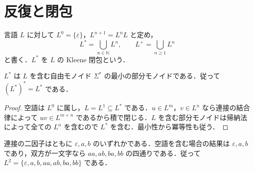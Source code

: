 \section{反復と閉包}
\begin{defn}[言語のKleene閉包]
言語 $L$ に対して $L^0=\{\varepsilon\}$，$L^{n+1}=L^nL$ と定め，
\[
 L^*=\bigcup_{n\in\mathbb N}L^n,\qquad
 L^+=\bigcup_{n\geq1}L^n
\]
と書く．$L^*$ を $L$ の Kleene 閉包という．
\end{defn}
\begin{prop}[Kleene閉包の最小性]
$L^*$ は $L$ を含む自由モノイド $\Sigma^*$ の最小の部分モノイドである．従って $(L^*)^*=L^*$ である．
\end{prop}
\begin{proof}
空語は $L^0$ に属し，$L=L^1\subseteq L^*$ である．$u\in L^m$，$v\in L^n$ なら連接の結合律によって $uv\in L^{m+n}$ であるから積で閉じる．$L$ を含む部分モノイドは帰納法によって全ての $L^n$ を含むので $L^*$ を含む．最小性から冪等性も従う．
\end{proof}
\begin{prop}[二文字の言語の二乗]
連接の二因子はともに $\varepsilon,a,b$ のいずれかである．空語を含む場合の結果は $\varepsilon,a,b$ であり，双方が一文字なら $aa,ab,ba,bb$ の四通りである．従って $L^2=\{\varepsilon,a,b,aa,ab,ba,bb\}$ である．
\end{prop}

